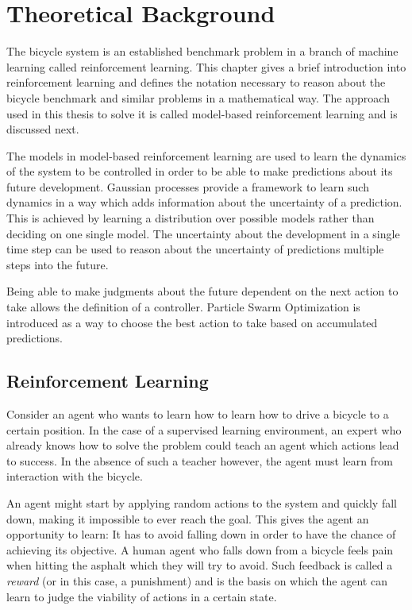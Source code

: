 \chapter{Theoretical Background}
\label{cha:theory}
The bicycle system is an established benchmark problem in a branch of machine learning called reinforcement learning.
This chapter gives a brief introduction into reinforcement learning and defines the notation necessary to reason about the bicycle benchmark and similar problems in a mathematical way.
The approach used in this thesis to solve it is called model-based reinforcement learning and is discussed next.

The models in model-based reinforcement learning are used to learn the dynamics of the system to be controlled in order to be able to make predictions about its future development.
Gaussian processes provide a framework to learn such dynamics in a way which adds information about the uncertainty of a prediction.
This is achieved by learning a distribution over possible models rather than deciding on one single model.
The uncertainty about the development in a single time step can be used to reason about the uncertainty of predictions multiple steps into the future.

Being able to make judgments about the future dependent on the next action to take allows the definition of a controller.
Particle Swarm Optimization is introduced as a way to choose the best action to take based on accumulated predictions.

\section{Reinforcement Learning}
Consider an agent who wants to learn how to learn how to drive a bicycle to a certain position.
In the case of a supervised learning environment, an expert who already knows how to solve the problem could teach an agent which actions lead to success.
In the absence of such a teacher however, the agent must learn from interaction with the bicycle.

An agent might start by applying random actions to the system and quickly fall down, making it impossible to ever reach the goal.
This gives the agent an opportunity to learn:
It has to avoid falling down in order to have the chance of achieving its objective.
A human agent who falls down from a bicycle feels pain when hitting the asphalt which they will try to avoid.
Such feedback is called a \emph{reward} (or in this case, a punishment) and is the basis on which the agent can learn to judge the viability of actions in a certain state.

